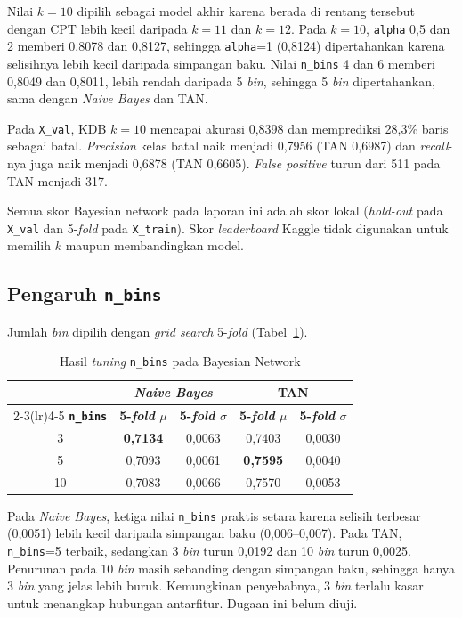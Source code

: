Nilai $k=10$ dipilih sebagai model akhir karena berada di rentang tersebut dengan
CPT lebih kecil daripada $k=11$ dan $k=12$. Pada $k=10$, \texttt{alpha} 0,5 dan 2
memberi 0,8078 dan 0,8127, sehingga \texttt{alpha}=1 (0,8124) dipertahankan karena
selisihnya lebih kecil daripada simpangan baku. Nilai \texttt{n\_bins} 4 dan 6
memberi 0,8049 dan 0,8011, lebih rendah daripada 5 \textit{bin}, sehingga 5
\textit{bin} dipertahankan, sama dengan \textit{Naive Bayes} dan TAN.

Pada \texttt{X\_val}, KDB $k=10$ mencapai akurasi 0,8398 dan memprediksi 28,3\%
baris sebagai batal. \textit{Precision} kelas batal naik menjadi 0,7956
(TAN 0,6987) dan \textit{recall}-nya juga naik menjadi 0,6878 (TAN 0,6605).
\textit{False positive} turun dari 511 pada TAN menjadi 317.

Semua skor Bayesian network pada laporan ini adalah skor lokal (\textit{hold-out}
pada \texttt{X\_val} dan 5-\textit{fold} pada \texttt{X\_train}). Skor
\textit{leaderboard} Kaggle tidak digunakan untuk memilih $k$ maupun
membandingkan model.

\subsection{Pengaruh \texttt{n\_bins}}
\label{sec:tuning-bn}

Jumlah \textit{bin} dipilih dengan \textit{grid search} 5-\textit{fold}
(Tabel~\ref{tab:tuning-bn}).

\begin{table}[H]
	\centering
	\caption{Hasil \textit{tuning} \texttt{n\_bins} pada Bayesian Network}
	\label{tab:tuning-bn}
	\begin{tabular}{c c c c c}
		\toprule
		& \multicolumn{2}{c}{\textbf{\textit{Naive Bayes}}} & \multicolumn{2}{c}{\textbf{TAN}} \\
		\cmidrule(lr){2-3}\cmidrule(lr){4-5}
		\textbf{\texttt{n\_bins}} & \textbf{5-\textit{fold} $\mu$} & \textbf{5-\textit{fold} $\sigma$} & \textbf{5-\textit{fold} $\mu$} & \textbf{5-\textit{fold} $\sigma$} \\
		\midrule
		3  & \textbf{0,7134} & 0,0063 & 0,7403 & 0,0030 \\
		5  & 0,7093 & 0,0061 & \textbf{0,7595} & 0,0040 \\
		10 & 0,7083 & 0,0066 & 0,7570 & 0,0053 \\
		\bottomrule
	\end{tabular}
\end{table}

Pada \textit{Naive Bayes}, ketiga nilai \texttt{n\_bins} praktis setara karena
selisih terbesar (0,0051) lebih kecil daripada simpangan baku (0,006--0,007).
Pada TAN, \texttt{n\_bins}=5 terbaik, sedangkan 3 \textit{bin} turun 0,0192 dan 10
\textit{bin} turun 0,0025. Penurunan pada 10 \textit{bin} masih sebanding dengan
simpangan baku, sehingga hanya 3 \textit{bin} yang jelas lebih buruk.
Kemungkinan penyebabnya, 3 \textit{bin} terlalu kasar untuk menangkap hubungan
antarfitur. Dugaan ini belum diuji.

